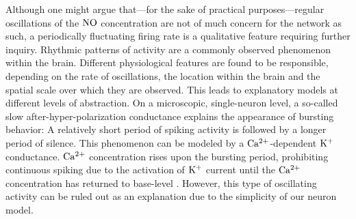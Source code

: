 \documentclass[10pt,a4paper]{article}
\begin{document}
Although one might argue that---for the sake of practical purposes---regular oscillations of the $\rm NO$ concentration are not of much concern for the network as such, a periodically fluctuating firing rate is a qualitative feature requiring further inquiry. Rhythmic patterns of activity are a commonly observed phenomenon within the brain. Different physiological features are found to be responsible, depending on the rate of oscillations, the location within the brain and the spatial scale over which they are observed. This leads to explanatory models at different levels of abstraction. On a microscopic, single-neuron level, a so-called slow after-hyper-polarization conductance explains the appearance of bursting behavior: A relatively short period of spiking activity is followed by a longer period of silence. This phenomenon can be modeled by a $\rm Ca^{2+}$-dependent $\rm K^{+}$ conductance. $\rm Ca^{2+}$ concentration rises upon the bursting period, prohibiting continuous spiking due to the activation of $\rm K^{+}$  current until the $\rm Ca^{2+}$ concentration has returned to base-level \cite[p.~203--207]{Theor_Neur_Dayan}. However, this type of oscillating activity can be ruled out as an explanation due to the simplicity of our neuron model.
\end{document}
